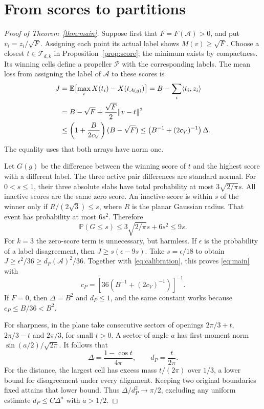 \documentclass[11pt,reqno]{amsart}
\numberwithin{equation}{section}
\theoremstyle{definition}
\theoremstyle{remark}
\newcommand{\E}{\mathbb E}
\newcommand{\Prob}{\mathbb P}
\newcommand{\cT}{\mathcal T}
\begin{document}
\section{From scores to partitions}
\begin{proof}[Proof of Theorem~\ref{thm:main}]
Suppose first that $F=F(\mathcal A)>0$, and put $v_i=z_i/\sqrt F$.
Assigning each point its actual label shows $M(v)\ge\sqrt F$.
Choose a closest $t\in\cT_{d,k}$ in Proposition~\ref{prop:score};
the minimum exists by compactness. Its winning cells define a
propeller $\mathcal P$ with the corresponding labels. The mean
loss from assigning the label of $\mathcal A$ to these scores is
\begin{align}\label{eq:calibration}
 J&=\E\bigl[\max_i X(t_i)-X(t_{\mathcal A(g)})\bigr]
       =B-\sum_i\langle t_i,z_i\rangle\notag\\
  &=B-\sqrt F+\frac{\sqrt F}{2}\|v-t\|^2\notag\\
  &\le\left(1+\frac B{2c_V}\right)(B-\sqrt F)
   \le\left(B^{-1}+(2c_V)^{-1}\right)\Delta.
\end{align}
The equality uses that both arrays have norm one.

Let $G(g)$ be the difference between the winning score of $t$ and
the highest score with a different label. The three active pair
differences are standard normal. For $0<s\le1$, their three
absolute slabs have total probability at most $3\sqrt{2/\pi}s$.
All inactive scores are the same zero score. An inactive score is
within $s$ of the winner only if
$R/(2\sqrt3)\le s$, where $R$ is the planar Gaussian radius.
That event has probability at most $6s^2$. Therefore
\begin{equation}\label{eq:margin}
                       \Prob(G\le s)\le3\sqrt{2/\pi}s+6s^2\le9s.
\end{equation}
For $k=3$ the zero-score term is unnecessary, but harmless.
If $\epsilon$ is the probability of a label disagreement, then
$J\ge s(\epsilon-9s)$. Take $s=\epsilon/18$ to obtain
$J\ge\epsilon^2/36\ge d_P(\mathcal A)^2/36$.
Together with \eqref{eq:calibration}, this proves \eqref{eq:main} with
\begin{equation}\label{eq:cp}
              c_P=\left[36\left(B^{-1}+(2c_V)^{-1}\right)\right]^{-1}.
\end{equation}
If $F=0$, then $\Delta=B^2$ and $d_P\le1$, and the same constant
works because $c_P\le B/36<B^2$.

For sharpness, in the plane take consecutive sectors of openings
$2\pi/3+t$, $2\pi/3-t$ and $2\pi/3$, for small $t>0$.
A sector of angle $a$ has first-moment norm $\sin(a/2)/\sqrt{2\pi}$.
It follows that
\begin{equation}\label{eq:sharp}
                 \Delta=\frac{1-\cos t}{4\pi},\qquad d_P=\frac{t}{2\pi}.
\end{equation}
For the distance, the largest cell has excess mass $t/(2\pi)$ over
$1/3$, a lower bound for disagreement under every alignment. Keeping
two original boundaries fixed attains that lower bound. Thus
$\Delta/d_P^2\to\pi/2$, excluding any uniform estimate
$d_P\le C\Delta^a$ with $a>1/2$.
\end{proof}
\end{document}
